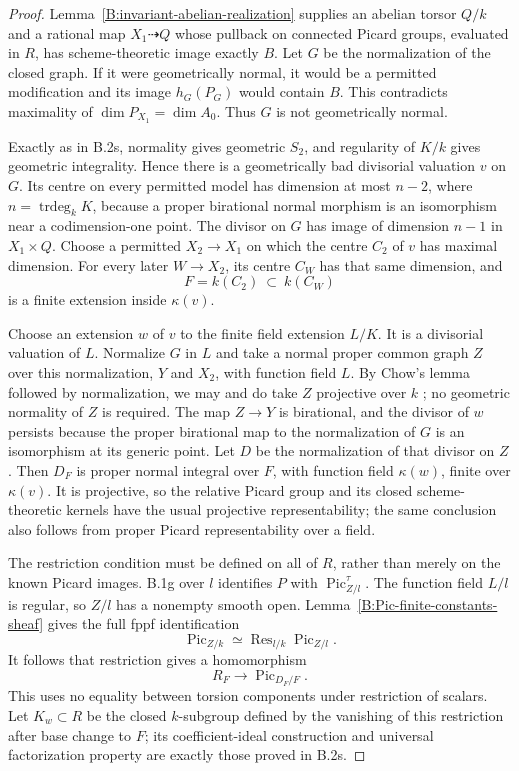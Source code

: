 \begin{proof}
Lemma~\ref{B:invariant-abelian-realization} supplies an
abelian torsor $Q/k$ and a rational map $X_1\dashrightarrow Q$
whose pullback on connected Picard groups, evaluated in $R$,
has scheme-theoretic image exactly $B$.
Let $G$ be the normalization of the closed graph.
If it were geometrically normal, it would be a permitted
modification and its image $h_G(P_G)$ would contain $B$.
This contradicts maximality of $\dim P_{X_1}=\dim A_0$.
Thus $G$ is not geometrically normal.

Exactly as in B.2s, normality gives geometric $S_2$, and
regularity of $K/k$ gives geometric integrality.  Hence there
is a geometrically bad divisorial valuation $v$ on $G$.
Its centre on every permitted model has dimension at most
$n-2$, where $n=\operatorname{trdeg}_k K$, because a proper
birational normal morphism is an isomorphism near a
codimension-one point.  The divisor on $G$ has image of
dimension $n-1$ in $X_1\times Q$.
Choose a permitted $X_2\to X_1$ on which the centre $C_2$
of $v$ has maximal dimension.  For every later $W\to X_2$,
its centre $C_W$ has that same dimension, and
\[
                     F=k(C_2)\ \subset\ k(C_W)
\]
is a finite extension inside $\kappa(v)$.

Choose an extension $w$ of $v$ to the finite field extension
$L/K$.  It is a divisorial valuation of $L$.
Normalize $G$ in $L$ and take a normal proper common graph
$Z$ over this normalization, $Y$ and $X_2$, with function
field $L$.  By Chow's lemma followed by normalization, we
may and do take $Z$ projective over $k$
\cite[Tag 0200]{StacksB}; no geometric normality of $Z$ is
required.  The map $Z\to Y$ is birational, and the divisor
of $w$ persists because the proper birational map to the
normalization of $G$ is an isomorphism at its generic point.
Let $D$ be the normalization of that divisor on $Z$.
Then $D_F$ is proper normal integral over $F$, with function
field $\kappa(w)$, finite over $\kappa(v)$.
It is projective, so the relative Picard group and its closed
scheme-theoretic kernels have the usual projective
representability; the same conclusion also follows from
proper Picard representability over a field.

The restriction condition must be defined on all of $R$,
rather than merely on the known Picard images.  B.1g over
$l$ identifies $P$ with $\operatorname{Pic}^{\tau}_{Z/l}$.
The function field $L/l$ is regular, so $Z/l$ has a nonempty
smooth open.  Lemma~\ref{B:Pic-finite-constants-sheaf} gives
the full fppf identification
\[
 \operatorname{Pic}_{Z/k}
       \simeq\operatorname{Res}_{l/k}\operatorname{Pic}_{Z/l}.
\]
It follows that restriction gives a homomorphism
\[
                       R_F\longrightarrow\operatorname{Pic}_{D_F/F}.
\]
This uses no equality between torsion components under
restriction of scalars.  Let $K_w\subset R$ be the closed
$k$-subgroup defined by the vanishing of this restriction
after base change to $F$; its coefficient-ideal construction
and universal factorization property are exactly those
proved in B.2s.


\end{proof}
